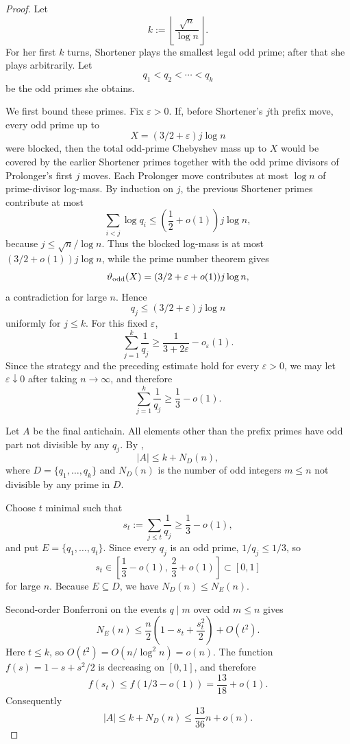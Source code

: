 \begin{proof}
Let
\[
  k:=\left\lfloor\frac{\sqrt n}{\log n}\right\rfloor.
\]
For her first $k$ turns, Shortener plays the smallest legal odd prime; after
that she plays arbitrarily.  Let
\[
  q_1<q_2<\cdots<q_k
\]
be the odd primes she obtains.

We first bound these primes.  Fix $\varepsilon>0$.  If, before Shortener's
$j$th prefix move, every odd prime up to
\[
  X=(3/2+\varepsilon)j\log n
\]
were blocked, then the total odd-prime Chebyshev mass up to $X$ would be
covered by the earlier Shortener primes together with the odd prime divisors of
Prolonger's first $j$ moves.  Each Prolonger move contributes at most
$\log n$ of prime-divisor log-mass.  By induction on $j$, the previous
Shortener primes contribute at most
\[
  \sum_{i<j}\log q_i\le \left(\frac12+o(1)\right)j\log n,
\]
because $j\le\sqrt n/\log n$.  Thus the blocked log-mass is at most
$(3/2+o(1))j\log n$, while the prime number theorem gives
\[
  \vartheta_{\rm odd}(X)=(3/2+\varepsilon+o(1))j\log n,
\]
a contradiction for large $n$.  Hence
\[
  q_j\le(3/2+\varepsilon)j\log n
\]
uniformly for $j\le k$.  For this fixed $\varepsilon$,
\[
  \sum_{j=1}^k\frac1{q_j}\ge\frac{1}{3+2\varepsilon}-o_\varepsilon(1).
\]
Since the strategy and the preceding estimate hold for every
$\varepsilon>0$, we may let $\varepsilon\downarrow0$ after taking
$n\to\infty$, and therefore
\[
  \sum_{j=1}^k\frac1{q_j}\ge\frac13-o(1).
  \tag{6.1}\label{eq:one-third-mass}
\]

Let $A$ be the final antichain.  All elements other than the prefix primes have
odd part not divisible by any $q_j$.  By ,
\[
  |A|\le k+N_D(n),
\]
where $D=\{q_1,\ldots,q_k\}$ and $N_D(n)$ is the number of odd integers
$m\le n$ not divisible by any prime in $D$.

Choose $t$ minimal such that
\[
  s_t:=\sum_{j\le t}\frac1{q_j}\ge\frac13-o(1),
\]
and put $E=\{q_1,\ldots,q_t\}$.  Since every $q_j$ is an odd prime,
$1/q_j\le1/3$, so
\[
  s_t\in\left[\frac13-o(1),\,\frac23+o(1)\right]\subset[0,1]
\]
for large $n$.  Because $E\subseteq D$, we have $N_D(n)\le N_E(n)$.

Second-order Bonferroni on the events $q\mid m$ over odd $m\le n$ gives
\[
  N_E(n)
  \le
  \frac n2\left(1-s_t+\frac{s_t^2}{2}\right)+O(t^2).
\]
Here $t\le k$, so $O(t^2)=O(n/\log^2n)=o(n)$.  The function
$f(s)=1-s+s^2/2$ is decreasing on $[0,1]$, and therefore
\[
  f(s_t)\le f(1/3-o(1))=\frac{13}{18}+o(1).
\]
Consequently
\[
  |A|\le k+N_D(n)\le\frac{13}{36}n+o(n).
\]
\end{proof}

